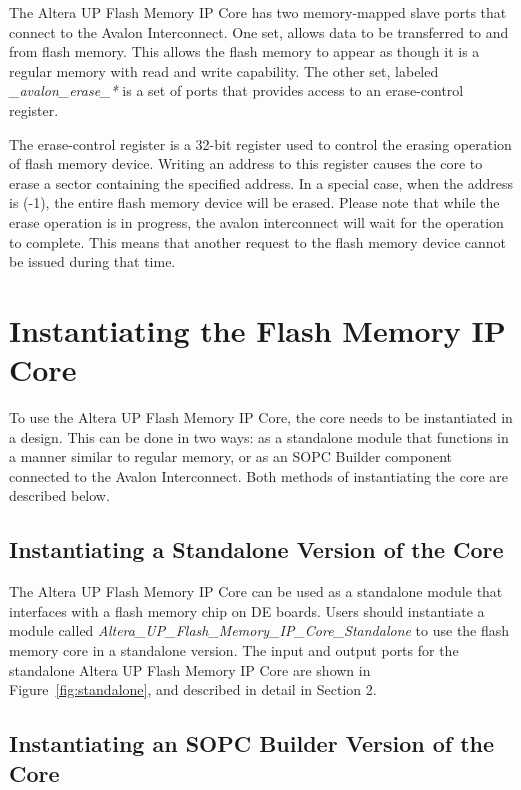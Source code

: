 The Altera UP Flash Memory IP Core has two memory-mapped slave ports that connect to the Avalon Interconnect. One set, allows
data to be transferred to and from flash memory. This allows the flash memory to appear as though it is a regular memory with
read and write capability. The other set, labeled {\it *\_avalon\_erase\_*} is a set of ports that provides access to an erase-control
register.

The erase-control register is a 32-bit register used to control the erasing operation of flash memory
device. Writing an address to this register causes the core to erase a sector containing the specified address. In a special case,
when the address is (-1), the entire flash memory device will be erased. Please note that while the erase operation is in progress,
the avalon interconnect will wait for the operation to complete. This means that another request to the flash memory device cannot
be issued during that time.

\section{Instantiating the Flash Memory IP Core}
\label{sec:instantiation}

To use the Altera UP Flash Memory IP Core, the core needs to be instantiated in a design. This can be done in two ways: as a standalone module that functions in a manner similar to regular memory, or as an SOPC Builder component connected to the Avalon Interconnect. Both methods of instantiating the core are described below.

\subsection{Instantiating a Standalone Version of the Core}

The Altera UP Flash Memory IP Core can be used as a standalone module that interfaces with a flash memory chip on DE boards. Users should instantiate a module called {\it Altera\_UP\_Flash\_Memory\_IP\_Core\_Standalone} to use the flash memory core in a standalone version. The input and output ports for the standalone Altera UP Flash Memory IP Core are shown in Figure~\ref{fig:standalone}, and described in detail in Section 2.

\subsection{Instantiating an SOPC Builder Version of the Core}

